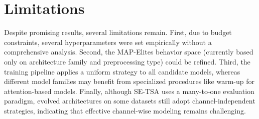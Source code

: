 \section*{Limitations}

Despite promising results, several limitations remain. First, due to budget constraints, several hyperparameters were set empirically without a comprehensive analysis. Second, the MAP-Elites behavior space (currently based only on architecture family and preprocessing type) could be refined. Third, the training pipeline applies a uniform strategy to all candidate models, whereas different model families may benefit from specialized procedures like warm-up for attention-based models. Finally, although SE-TSA uses a many-to-one evaluation paradigm, evolved architectures on some datasets still adopt channel-independent strategies, indicating that effective channel-wise modeling remains challenging.
